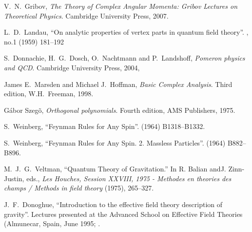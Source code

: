 \begin{thebibliography}{99}
V.~N.~Gribov,
\emph{The Theory of Complex Angular Momenta: Gribov Lectures on Theoretical Physics}.
Cambridge University Press, 2007.\newline
{\tt{}}

L.~D.~Landau,
``On analytic properties of vertex parts in quantum field theory''.
 , no.1 (1959) 181--192\newline
{\tt{}}

S.~Donnachie, H.~G.~Dosch, O.~Nachtmann and P.~Landshoff,
\emph{Pomeron physics and QCD}.
Cambridge University Press, 2004,

  James E.~Marsden and Michael J.~Hoffman,
  \emph{Basic Complex Analysis}.
  Third edition, W.H.~Freeman, 1998.

  G\'abor Szeg\~o,
  \emph{Orthogonal polynomials}.
  Fourth edition, AMS Publishers, 1975.

S.~Weinberg,
``Feynman Rules for Any Spin''.
  (1964) B1318--B1332.\newline
{\tt{}}

S.~Weinberg,
``Feynman Rules for Any Spin. 2. Massless Particles''.
  (1964) B882--B896.\newline
{\tt{}}

M.~J.~G.~Veltman,
``Quantum Theory of Gravitation.''
In R. Balian andJ. Zinn-Justin, eds.,
\emph{Les Houches, Session XXVIII, 1975 - Methodes en theories des champs / Methods in field theory}
(1975), 265--327.

J.~F.~Donoghue,
``Introduction to the effective field theory description of gravity''.
Lectures presented at the Advanced School on Effective Field Theories
(Almunecar, Spain, June 1995; .


\end{thebibliography}

